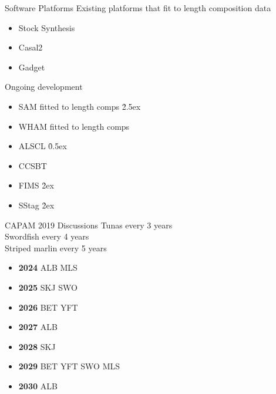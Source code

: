 \documentclass[aspectratio=169]{beamer}
\begin{document}
\begin{frame}{Software Platforms}\small
  Existing platforms that fit to length composition data
  \begin{itemize}
    \item[] Stock Synthesis\\[-1ex]
    \item[] Casal2\\[-1ex]
    \item[] Gadget\\[5ex]
  \end{itemize}
  Ongoing development
  \begin{itemize}
    \item[] SAM fitted to length comps \h{2.5ex}\\[-1ex]
    \item[] WHAM fitted to length comps \\[-1ex]
    \item[] ALSCL \h{0.5ex}\\[-1ex]
    \item[] CCSBT \\[-1ex]
    \item[] FIMS \h{2ex}\\[-1ex]
    \item[] SStag \h{2ex}\\
  \end{itemize}
\end{frame}


\begin{frame}{CAPAM 2019 Discussions}\small
  Tunas every 3 years\\[0.5ex]
  Swordfish every 4 years\\[0.5ex]
  Striped marlin every 5 years\\[2ex]
  \begin{itemize}
    \item[] {\bf 2024} ALB MLS\\[-1ex]
    \item[] {\bf 2025} SKJ SWO\\[-1ex]
    \item[] {\bf 2026} BET YFT\\[-1ex]
    \item[] {\bf 2027} ALB\\[-1ex]
    \item[] {\bf 2028} SKJ\\[-1ex]
    \item[] {\bf 2029} BET YFT SWO MLS\\[-1ex]
    \item[] {\bf 2030} ALB
  \end{itemize}
\end{frame}
\end{document}
